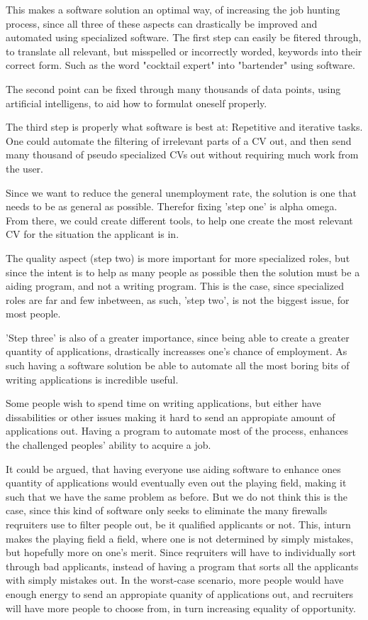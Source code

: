 This makes a software solution an optimal way, of increasing the job hunting
process, since all three of these aspects can drastically be improved and automated
using specialized software. 
The first step can easily be fitered through, to translate all relevant, but
misspelled or incorrectly worded, keywords into their correct form. Such
as the word "cocktail expert" into "bartender" using software.

The second point can be fixed through many thousands of data points, using
artificial intelligens, to aid how to formulat oneself properly. 

The third step is properly what software is best at: Repetitive and iterative
tasks.
One could automate the filtering of irrelevant parts of a CV out, and then send
many thousand of pseudo specialized CVs out without requiring much work from the
user.

Since we want to reduce the general unemployment rate, the solution is one that needs to 
be as general as possible. Therefor fixing 'step one' is alpha omega.
From there, we could create different tools, to help one create the most relevant
CV for the situation the applicant is in.

The quality aspect (step two) is more important for more specialized roles, 
but since the intent is to help as many people as possible then the solution
must be a aiding program, and not a writing program.
This is the case, since specialized roles are far and few inbetween,
as such, 'step two', is not the biggest issue, for most people. 

'Step three' is also of a greater importance, since being able to create a
greater quantity of applications, drastically increasses one's chance of
employment. 
As such having a software solution be able to automate all the most boring
bits of writing applications is incredible useful.

Some people wish to spend time on writing applications, but either have
dissabilities or other issues making it hard to send an appropiate amount
of applications out. Having a program to automate most of the process, enhances
the challenged peoples' ability to acquire a job.

It could be argued, that having everyone use aiding software to enhance ones
quantity of applications would eventually even out the playing field, making
it such that we have the same problem as before. 
But we do not think this is the case, since this kind of software only seeks
to eliminate the many firewalls reqruiters use to filter people out, be it 
qualified applicants or not.
This, inturn makes the playing field a field, where one is not determined by
simply mistakes, but hopefully more on one's merit. Since reqruiters will have to 
individually sort through bad applicants, instead of having a program that sorts
all the applicants with simply mistakes out. In the worst-case scenario, more
people would have enough energy to send an appropiate quanity of applications
out, and recruiters will have more people to choose from, in turn increasing
equality of opportunity.

